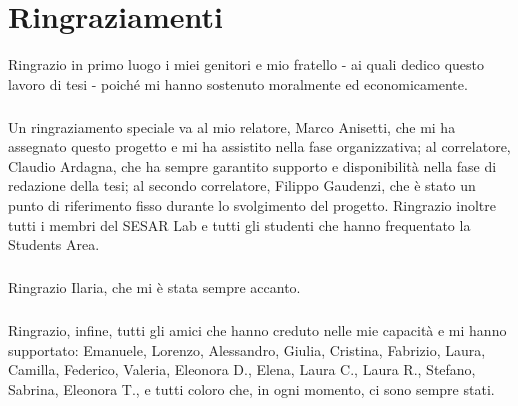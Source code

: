 \chapter*{Ringraziamenti}

Ringrazio in primo luogo i miei genitori e mio fratello - ai quali dedico questo lavoro di tesi - poiché mi hanno sostenuto moralmente ed economicamente.
\paragraph{}
Un ringraziamento speciale va al mio relatore, Marco Anisetti, che mi ha assegnato questo progetto e mi ha assistito nella fase organizzativa; al correlatore, Claudio Ardagna, che ha sempre garantito supporto e disponibilità nella fase di redazione della tesi; al secondo correlatore, Filippo Gaudenzi, che è stato un punto di riferimento fisso durante lo svolgimento del progetto.
Ringrazio inoltre tutti i membri del SESAR Lab e tutti gli studenti che hanno frequentato la Students Area.
\paragraph{}
Ringrazio Ilaria, che mi è stata sempre accanto.
\paragraph{}
Ringrazio, infine, tutti gli amici che hanno creduto nelle mie capacità e mi hanno supportato: Emanuele, Lorenzo, Alessandro, Giulia, Cristina, Fabrizio, Laura, Camilla, Federico, Valeria, Eleonora D., Elena, Laura C., Laura R., Stefano, Sabrina, Eleonora T., e tutti coloro che, in ogni momento, ci sono sempre stati.